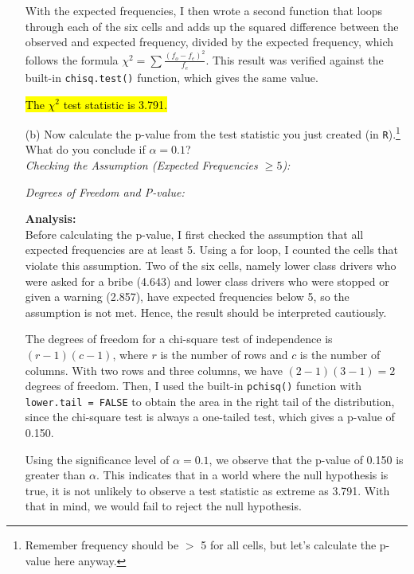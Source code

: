 \documentclass[12pt,letterpaper]{article}
\begin{document}
\begin{enumerate}
	With the expected frequencies, I then wrote a second function that loops through each of the six cells and adds up the squared difference between the observed and expected frequency, divided by the expected frequency, which follows the formula $\chi^2 = \sum \frac{(f_o - f_e)^2}{f_e}$. This result was verified against the built-in \texttt{chisq.test()} function, which gives the same value.
	
	\hl{The {$\chi^2$} test statistic is 3.791.}
	
	\vspace{.5cm}
	
	\item [(b)]
	Now calculate the p-value from the test statistic you just created (in \texttt{R}).\footnote{Remember frequency should be $>$ 5 for all cells, but let's calculate the p-value here anyway.}  What do you conclude if $\alpha = 0.1$?\\
	
	\textit{Checking the Assumption (Expected Frequencies $\geq 5$):}
	
	
	\textit{Degrees of Freedom and P-value:}
	
	
	\textbf{Analysis:}\\
	Before calculating the p-value, I first checked the assumption that all expected frequencies are at least 5. Using a for loop, I counted the cells that violate this assumption. Two of the six cells, namely lower class drivers who were asked for a bribe (4.643) and lower class drivers who were stopped or given a warning (2.857), have expected frequencies below 5, so the assumption is not met. Hence, the result should be interpreted cautiously.
	
	The degrees of freedom for a chi-square test of independence is $(r-1)(c-1)$, where $r$ is the number of rows and $c$ is the number of columns. With two rows and three columns, we have $(2-1)(3-1) = 2$ degrees of freedom. Then, I used the built-in \texttt{pchisq()} function with \texttt{lower.tail = FALSE} to obtain the area in the right tail of the distribution, since the chi-square test is always a one-tailed test, which gives a p-value of 0.150.
	
	Using the significance level of $\alpha = 0.1$, we observe that the p-value of 0.150 is greater than $\alpha$. This indicates that in a world where the null hypothesis is true, it is not unlikely to observe a test statistic as extreme as 3.791. With that in mind, we would fail to reject the null hypothesis.
	

\end{enumerate}
\end{document}
